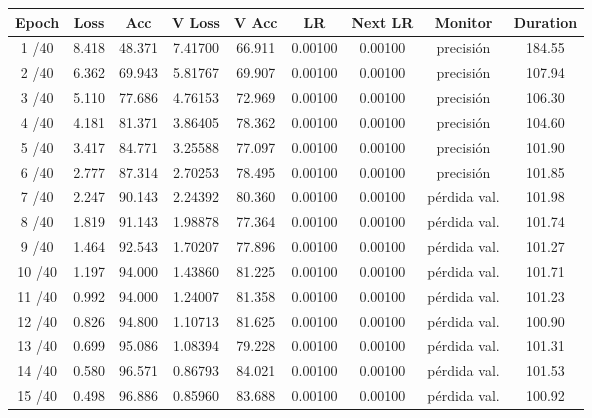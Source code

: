         \begin{table}[H]
         \small
         \centering
         \begin{tabular}{|c|c|c|c|c|c|c|c|c|}
         \hline
         \textbf{Epoch} & \textbf{Loss} & \textbf{Acc} & \textbf{V Loss} & \textbf{V Acc} & \textbf{LR} & \textbf{Next LR} & \textbf{Monitor} & \textbf{Duration} \\ \hline
         1 /40  & 8.418  & 48.371 & 7.41700 & 66.911 & 0.00100 & 0.00100 & precisión & 184.55 \\ \hline
         2 /40  & 6.362  & 69.943 & 5.81767 & 69.907 & 0.00100 & 0.00100 & precisión & 107.94 \\ \hline
         3 /40  & 5.110  & 77.686 & 4.76153 & 72.969 & 0.00100 & 0.00100 & precisión & 106.30 \\ \hline
         4 /40  & 4.181  & 81.371 & 3.86405 & 78.362 & 0.00100 & 0.00100 & precisión & 104.60 \\ \hline
         5 /40  & 3.417  & 84.771 & 3.25588 & 77.097 & 0.00100 & 0.00100 & precisión & 101.90 \\ \hline
         6 /40  & 2.777  & 87.314 & 2.70253 & 78.495 & 0.00100 & 0.00100 & precisión & 101.85 \\ \hline
         7 /40  & 2.247  & 90.143 & 2.24392 & 80.360 & 0.00100 & 0.00100 & pérdida val. & 101.98 \\ \hline
         8 /40  & 1.819  & 91.143 & 1.98878 & 77.364 & 0.00100 & 0.00100 & pérdida val. & 101.74 \\ \hline
         9 /40  & 1.464  & 92.543 & 1.70207 & 77.896 & 0.00100 & 0.00100 & pérdida val. & 101.27 \\ \hline
         10 /40 & 1.197  & 94.000 & 1.43860 & 81.225 & 0.00100 & 0.00100 & pérdida val. & 101.71 \\ \hline
         11 /40 & 0.992  & 94.000 & 1.24007 & 81.358 & 0.00100 & 0.00100 & pérdida val. & 101.23 \\ \hline
         12 /40 & 0.826  & 94.800 & 1.10713 & 81.625 & 0.00100 & 0.00100 & pérdida val. & 100.90 \\ \hline
         13 /40 & 0.699  & 95.086 & 1.08394 & 79.228 & 0.00100 & 0.00100 & pérdida val. & 101.31 \\ \hline
         14 /40 & 0.580  & 96.571 & 0.86793 & 84.021 & 0.00100 & 0.00100 & pérdida val. & 101.53 \\ \hline
         15 /40 & 0.498  & 96.886 & 0.85960 & 83.688 & 0.00100 & 0.00100 & pérdida val. & 100.92 \\ \hline

\end{tabular}
\end{table}
